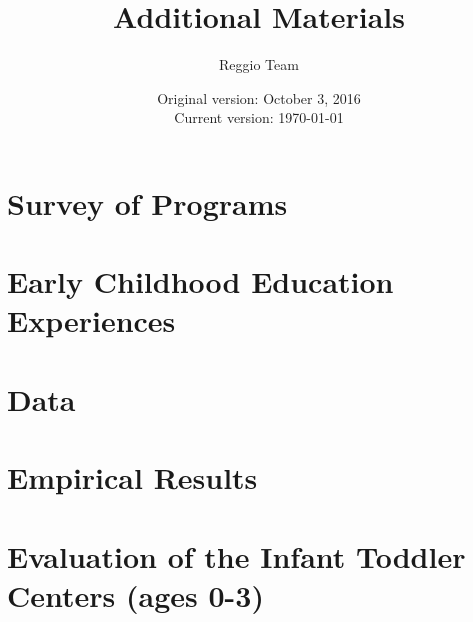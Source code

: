 






\title{\Large \textbf{Additional Materials}}
\author{\normalsize Reggio Team}
\date{\normalsize Original version: October 3, 2016 \\ Current version: \today}
\maketitle

\tableofcontents

\doublespacing

\begin{appendices}

\section{Survey of Programs}
\label{sec:survey}
 

\section{Early Childhood Education Experiences}
\label{sec:eceexperiences}


\section{Data}
\label{sec:data}


\section{Empirical Results}
\label{sec:results}


\section{Evaluation of the Infant Toddler Centers (ages 0-3)} \label{sec:ITC}

\label{sec:asilo_results}


%

\end{appendices}





